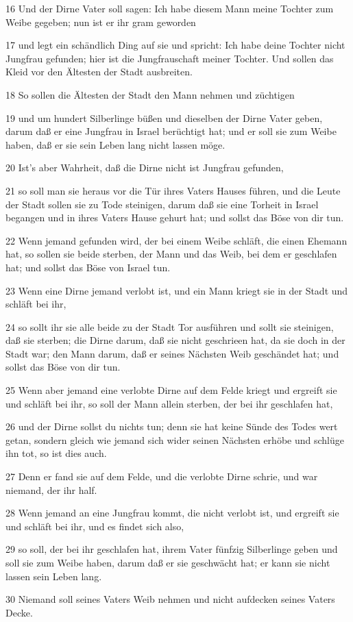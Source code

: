 \par 16 Und der Dirne Vater soll sagen: Ich habe diesem Mann meine Tochter zum Weibe gegeben; nun ist er ihr gram geworden
\par 17 und legt ein schändlich Ding auf sie und spricht: Ich habe deine Tochter nicht Jungfrau gefunden; hier ist die Jungfrauschaft meiner Tochter. Und sollen das Kleid vor den Ältesten der Stadt ausbreiten.
\par 18 So sollen die Ältesten der Stadt den Mann nehmen und züchtigen
\par 19 und um hundert Silberlinge büßen und dieselben der Dirne Vater geben, darum daß er eine Jungfrau in Israel berüchtigt hat; und er soll sie zum Weibe haben, daß er sie sein Leben lang nicht lassen möge.
\par 20 Ist's aber Wahrheit, daß die Dirne nicht ist Jungfrau gefunden,
\par 21 so soll man sie heraus vor die Tür ihres Vaters Hauses führen, und die Leute der Stadt sollen sie zu Tode steinigen, darum daß sie eine Torheit in Israel begangen und in ihres Vaters Hause gehurt hat; und sollst das Böse von dir tun.
\par 22 Wenn jemand gefunden wird, der bei einem Weibe schläft, die einen Ehemann hat, so sollen sie beide sterben, der Mann und das Weib, bei dem er geschlafen hat; und sollst das Böse von Israel tun.
\par 23 Wenn eine Dirne jemand verlobt ist, und ein Mann kriegt sie in der Stadt und schläft bei ihr,
\par 24 so sollt ihr sie alle beide zu der Stadt Tor ausführen und sollt sie steinigen, daß sie sterben; die Dirne darum, daß sie nicht geschrieen hat, da sie doch in der Stadt war; den Mann darum, daß er seines Nächsten Weib geschändet hat; und sollst das Böse von dir tun.
\par 25 Wenn aber jemand eine verlobte Dirne auf dem Felde kriegt und ergreift sie und schläft bei ihr, so soll der Mann allein sterben, der bei ihr geschlafen hat,
\par 26 und der Dirne sollst du nichts tun; denn sie hat keine Sünde des Todes wert getan, sondern gleich wie jemand sich wider seinen Nächsten erhöbe und schlüge ihn tot, so ist dies auch.
\par 27 Denn er fand sie auf dem Felde, und die verlobte Dirne schrie, und war niemand, der ihr half.
\par 28 Wenn jemand an eine Jungfrau kommt, die nicht verlobt ist, und ergreift sie und schläft bei ihr, und es findet sich also,
\par 29 so soll, der bei ihr geschlafen hat, ihrem Vater fünfzig Silberlinge geben und soll sie zum Weibe haben, darum daß er sie geschwächt hat; er kann sie nicht lassen sein Leben lang.
\par 30 Niemand soll seines Vaters Weib nehmen und nicht aufdecken seines Vaters Decke.

